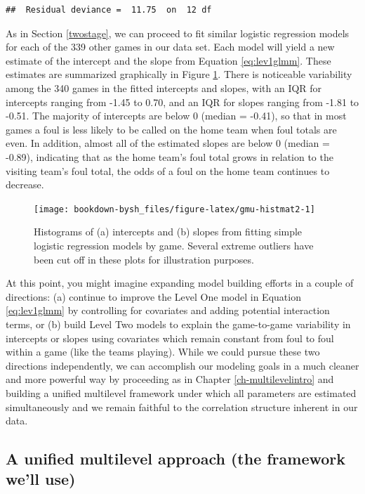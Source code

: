 \documentclass[
]{krantz}
\begin{document}
\begin{verbatim}
##  Residual deviance =  11.75  on  12 df
\end{verbatim}

As in Section \ref{twostage}, we can proceed to fit similar logistic regression models for each of the 339 other games in our data set. Each model will yield a new estimate of the intercept and the slope from Equation \eqref{eq:lev1glmm}. These estimates are summarized graphically in Figure \ref{fig:gmu-histmat2}. There is noticeable variability among the 340 games in the fitted intercepts and slopes, with an IQR for intercepts ranging from -1.45 to 0.70, and an IQR for slopes ranging from -1.81 to -0.51. The majority of intercepts are below 0 (median = -0.41), so that in most games a foul is less likely to be called on the home team when foul totals are even. In addition, almost all of the estimated slopes are below 0 (median = -0.89), indicating that as the home team's foul total grows in relation to the visiting team's foul total, the odds of a foul on the home team continues to decrease.

\begin{figure}

{\centering \texttt{[image: bookdown-bysh\_files/figure-latex/gmu-histmat2-1]} 

}

\caption{Histograms of (a) intercepts and (b) slopes from fitting simple logistic regression models by game.  Several extreme outliers have been cut off in these plots for illustration purposes.}\label{fig:gmu-histmat2}
\end{figure}

At this point, you might imagine expanding model building efforts in a couple of directions: (a) continue to improve the Level One model in Equation \eqref{eq:lev1glmm} by controlling for covariates and adding potential interaction terms, or (b) build Level Two models to explain the game-to-game variability in intercepts or slopes using covariates which remain constant from foul to foul within a game (like the teams playing). While we could pursue these two directions independently, we can accomplish our modeling goals in a much cleaner and more powerful way by proceeding as in Chapter \ref{ch-multilevelintro} and building a unified multilevel framework under which all parameters are estimated simultaneously and we remain faithful to the correlation structure inherent in our data.

\hypertarget{unified-glmm}{%
\subsection{A unified multilevel approach (the framework we'll use)}\label{unified-glmm}}
\end{document}
